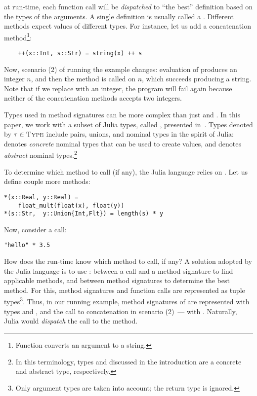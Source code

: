 at run-time, each function call will be \emph{dispatched} 
to ``the best'' definition based on the types of the arguments.
A single definition is usually called a . 
Different methods expect values of different types. %
For instance, let us add a concatenation method\footnote{Function 
	 converts an argument to a string.}:
\begin{verbatim}
    ++(x::Int, s::Str) = string(x) ++ s
\end{verbatim}
Now, scenario (2) of running the example changes:
evaluation of  produces an integer $n$, 
and then the method  is called on 
\jlcode{(}$n$,
which succeeds producing a string.
Note that if we replace  with an integer, the program will fail
again because neither of the concatenation methods accepts two integers.

Types used in method signatures can be more complex than 
just  and . 
In this paper, we work with a subset of Julia types, called \BetaJulia,
presented in~.
Types denoted by $\tau \in \textsc{Type}$ include pairs,
unions, and nominal types in the spirit of Julia:
\cname denotes \emph{concrete} nominal types that can be used to create values,
and \aname denotes \emph{abstract} nominal types.\footnote{
In this terminology, types  and  discussed 
in the introduction are a concrete and abstract type, respectively.}

To determine which method to call (if any), the Julia language relies on
.
Let us define couple more methods:
\begin{verbatim}
*(x::Real, y::Real) = 
    float_mult(float(x), float(y))
*(s::Str,  y::Union{Int,Flt}) = length(s) * y
\end{verbatim}
Now, consider a call:
\begin{verbatim}
"hello" * 3.5
\end{verbatim}
 

How does the run-time know which method to call, if any? A solution adopted
by the Julia language is to use : 
between a call and a method signature to find applicable methods,
and between method signatures to determine the best method. 
For this, method signatures and function calls are represented as 
tuple types\footnote{Only argument types are taken into account; 
	the return type is ignored.}.
Thus, in our running example, method signatures of \jlcode{**} 
are represented with types
 and , and the call to concatenation
in scenario (2)~--- with . 
Naturally, Julia would \emph{dispatch}
the call to the  method.



